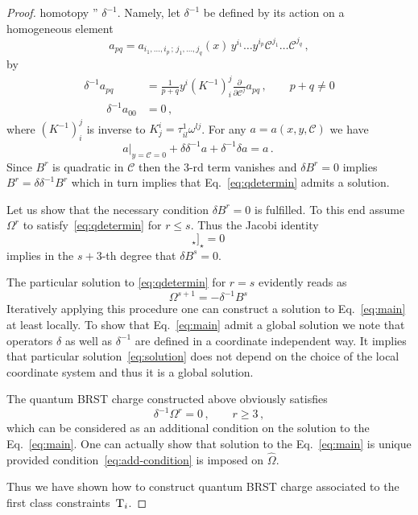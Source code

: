 \documentclass[a4paper,11pt,oneside]{amsart}
\theoremstyle{plain}
\numberwithin{equation}{section} %
\numberwithin{figure}{section} %
\newcommand{\qcommut}[2]{[#1,#2]_\star}
\def\d{\partial}
\newcommand{\dl}[1]{\displaystyle\frac{{\d}}{\d #1}}
\def\cc{{\mathcal C}}
\def\cT{{\rm T}}
\begin{document}
\begin{proof}
homotopy '' $\delta^{-1}$.  Namely, let $\delta^{-1}$
be defined by its action on a homogeneous element
\begin{equation}
  a_{pq}=a_{i_1,\ldots,i_p\,;\,j_1,\ldots,j_q}(x)\,y^{i_1}\ldots y^{i_p}
\cc^{j_1}\ldots \cc^{j_q}\,,
\end{equation}
by
\begin{equation}
\begin{split}
  \delta^{-1}a_{pq}&=\frac{1}{p+q}y^i (K^{-1})^j_i
\dl{\cc^j}a_{pq}\,,  \qquad p+q \neq 0 \\
 \qquad \delta^{-1} a_{00}&=0\,,~
\end{split}
\end{equation}
where $(K^{-1})^j_i$ is inverse to
$K^i_j=\tau^1_{il}\omega^{lj}$.  For any $a=a(x,y,\cc)$ we have
\begin{equation}
a|_{y=\cc=0}+\delta\delta^{-1} a+\delta^{-1}\delta
 a=a\,. \qquad
\end{equation}
Since $B^r$ is quadratic in
$\cc$ then the 3-rd term vanishes and $\delta B^r=0$ implies
$B^r=\delta\delta^{-1}B^r$ which in turn implies that
Eq.~\eqref{eq:qdetermin} admits a solution.

\noindent
Let us show that the necessary
condition $\delta B^r=0$ is fulfilled.  To this end assume
$\Omega^r$ to satisfy~\eqref{eq:qdetermin}
for $r \leq s$. Thus the Jacobi identity
\begin{equation}
  \qcommut{\sum_{t=0}^{s}\Omega^t}
{\qcommut{\sum_{t=0}^{s}\Omega^t}{\sum_{t=0}^{s}\Omega^t}}=0\,
\end{equation}
implies in the $s+3$-th degree that $\delta B^{s}=0$.

\noindent
The particular solution
to \eqref{eq:qdetermin} for $r=s$ evidently reads as
\begin{equation}
\label{eq:solution}
  \Omega^{s+1}=-\delta^{-1}B^s\,
\end{equation}
Iteratively applying this procedure one can construct a
solution to Eq.~\eqref{eq:main} at least locally.  To
show that Eq.~\eqref{eq:main} admit a global solution we note
that operators $\delta$ as well as $\delta^{-1}$ are defined in
a coordinate independent way.  It implies that particular
solution~\eqref{eq:solution} does not depend on the choice
of the local coordinate system and thus it is a global solution.



\noindent
The quantum BRST charge constructed above obviously
satisfies
\begin{equation}
\label{eq:add-condition}
 \delta^{-1}\Omega^r=0\,,\qquad r \geq 3 \,,
\end{equation}
which can be considered as an additional condition on
the solution to the Eq.~\eqref{eq:main}.  One can
actually show that solution to the Eq.~\eqref{eq:main} is unique
provided condition~\eqref{eq:add-condition} is imposed
on $\hat\Omega$.

\noindent
Thus we have shown how to
construct quantum BRST charge associated to the first
class constraints~$\cT_i$.
\end{proof}
\end{document}
